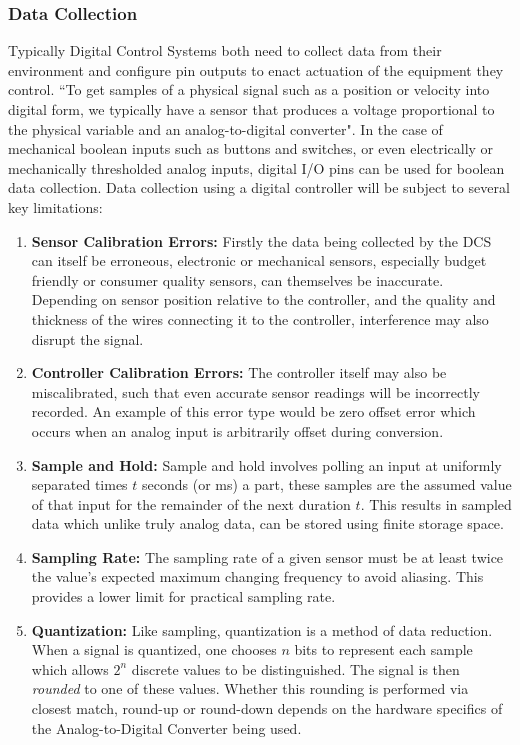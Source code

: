 \documentclass[../main.tex]{subfiles}
\begin{document}
\subsubsection{Data Collection}
\label{data_col}
Typically Digital Control Systems both need to collect data from their environment and configure pin outputs to enact actuation of the equipment they control. ``To get samples of a physical signal such as a position or velocity into digital form, we typically have a sensor that produces a voltage proportional to the physical variable and an analog-to-digital converter"\cite[p.~102]{dynamic_systems}. In the case of mechanical boolean inputs such as buttons and switches, or even electrically or mechanically thresholded analog inputs, digital I/O pins can be used for boolean data collection. Data collection using a digital controller will be subject to several key limitations:
\begin{enumerate}[label=\arabic*.]

\item \textbf{Sensor Calibration Errors:} Firstly the data being collected by the DCS can itself be erroneous, electronic or mechanical sensors, especially budget friendly or consumer quality sensors, can themselves be inaccurate. Depending on sensor position relative to the controller, and the quality and thickness of the wires connecting it to the controller, interference may also disrupt the signal.

\item \textbf{Controller Calibration Errors:} The controller itself may also be miscalibrated, such that even accurate sensor readings will be incorrectly recorded. An example of this error type would be zero offset error\cite[p.~334]{industrial_control} which occurs when an analog input is arbitrarily offset during conversion.

\item \textbf{Sample and Hold:} Sample and hold involves polling an input at uniformly separated times $t$ seconds (or ms) a part, these samples are the assumed value of that input for the remainder of the next duration $t$\cite[p.~103]{dynamic_systems}. This results in sampled data which unlike truly analog data, can be stored using finite storage space.

\item \textbf{Sampling Rate:} The sampling rate of a given sensor must be at least twice the value's expected maximum changing frequency to avoid aliasing\cite[p.~103-109]{dynamic_systems}. This provides a lower limit for practical sampling rate.

\item \textbf{Quantization:} Like sampling, quantization is a method of data reduction\cite[p.~324]{dynamic_systems}\cite[p.~332]{industrial_control}. When a signal is quantized, one chooses $n$ bits to represent each sample which allows $2^n$ discrete values to be distinguished. The signal is then \textit{rounded} to one of these values. Whether this rounding is performed via closest match, round-up or round-down depends on the hardware specifics of the Analog-to-Digital Converter being used.

\end{enumerate}
\end{document}
